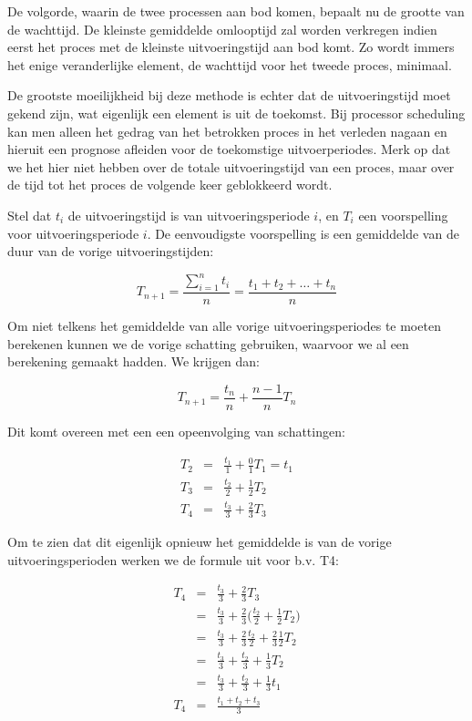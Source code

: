 De volgorde, waarin de twee processen aan bod komen, bepaalt nu
de grootte van de wachttijd. De kleinste gemiddelde omlooptijd zal
worden verkregen indien eerst het proces met de kleinste
uitvoeringstijd aan bod komt. Zo wordt immers het enige veranderlijke
element, de wachttijd voor het tweede proces, minimaal.

De grootste moeilijkheid bij deze methode is echter dat de
uitvoeringstijd moet gekend zijn, wat eigenlijk een element is uit de
toekomst. Bij processor scheduling kan men alleen het gedrag van het
betrokken proces in het verleden nagaan en hieruit een prognose
afleiden voor de toekomstige uitvoerperiodes. Merk op dat we het hier
niet hebben over de totale uitvoeringstijd van een proces, maar over
de tijd tot het proces de volgende keer geblokkeerd wordt.

Stel dat $t_i$ de uitvoeringstijd is van uitvoeringsperiode $i$, en
$T_i$ een voorspelling voor uitvoeringsperiode $i$. De eenvoudigste
voorspelling is een gemiddelde van de duur van de vorige
uitvoeringstijden:

\begin{displaymath}
T_{n+1} = \frac{\sum_{i=1}^{n}t_i}{n} = \frac{t_1 + t_2 + \ldots + t_n}{n}
\end{displaymath}

Om niet telkens het gemiddelde van alle vorige
uitvoeringsperiodes te moeten berekenen kunnen we de vorige schatting
gebruiken, waarvoor we al een berekening gemaakt hadden. We krijgen
dan:

\begin{displaymath}
T_{n+1} = \frac{t_n}{n} + \frac{n-1}{n}T_n
\end{displaymath}

Dit komt overeen met een een opeenvolging van
schattingen:

\begin{eqnarray*}
T_2 & = & \frac{t_1}{1} + \frac{0}{1}T_1 = t_1 \\
T_3 & = & \frac{t_2}{2} + \frac{1}{2}T_2       \\
T_4 & = & \frac{t_3}{3} + \frac{2}{3}T_3
\end{eqnarray*}

Om te zien dat dit eigenlijk opnieuw het gemiddelde is van de
vorige uitvoeringsperioden werken we de formule uit voor b.v.
T4:

\begin{eqnarray*}
T_4 & = & \frac{t_3}{3} + \frac{2}{3}T_3 \\
    & = & \frac{t_3}{3} + \frac{2}{3}\Bigg(\frac{t_2}{2} + \frac{1}{2}T_2\Bigg)
\\
    & = & \frac{t_3}{3} + \frac{2}{3}\frac{t_2}{2} + \frac{2}{3}\frac{1}{2}T_2
\\
    & = & \frac{t_3}{3} + \frac{t_2}{3} + \frac{1}{3}T_2 \\
    & = & \frac{t_3}{3} + \frac{t_2}{3} + \frac{1}{3}t_1 \\
T_4 & = & \frac{t_1 + t_2 + t_3}{3}
\end{eqnarray*}

